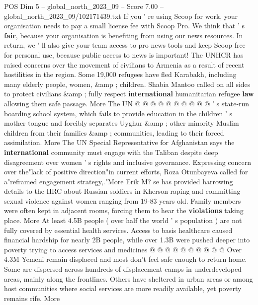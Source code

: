 \begin{textsample}{POS Dim 5 – global\_north\_2023\_09 – Score 7.00 – global\_north\_2023\_09/102171439.txt}
If you ' re using Scoop for work, your organisation needs to pay a small license fee with Scoop Pro.
We think that ' s \textbf{fair}, because your organisation is benefiting from using our news resources.
In return, we ' ll also give your team access to pro news tools and keep Scoop free for personal use, because public access to news is important!
The UNHCR has raised concerns over the movement of civilians to Armenia as a result of recent hostilities in the region.
Some 19,000 refugees have fled Karabakh, including many elderly people, women, \&amp ; children.
Shabia Mantoo called on all sides to protect civilians \&amp ; fully respect \textbf{international} humanitarian refugee \textbf{law} allowing them safe passage.
More The UN @ @ @ @ @ @ @ @ @ @ ' s state-run boarding school system, which fails to provide education in the children ' s mother tongue and forcibly separates Uyghur \&amp ; other minority Muslim children from their families \&amp ; communities, leading to their forced assimilation.
More The UN Special Representative for Afghanistan says the \textbf{international} community must engage with the Taliban despite deep disagreement over women ' s rights and inclusive governance.
Expressing concern over the"lack of positive direction"in current efforts, Roza Otunbayeva called for a"reframed engagement strategy,."More Erik M? se has provided harrowing details to the HRC about Russian soldiers in Kherson raping and committing sexual violence against women ranging from 19-83 years old.
Family members were often kept in adjacent rooms, forcing them to hear the \textbf{violations} taking place.
More At least 4.5B people ( over half the world ' s population ) are not fully covered by essential health services.
Access to basis healthcare caused financial hardship for nearly 2B people, while over 1.3B were pushed deeper into poverty trying to access services and medicines @ @ @ @ @ @ @ @ @ @ Over 4.3M Yemeni remain displaced and most don't feel safe enough to return home.
Some are dispersed across hundreds of displacement camps in underdeveloped areas, mainly along the frontlines.
Others have sheltered in urban areas or among host communities where social services are more readily available, yet poverty remains rife.
More

\end{textsample}
